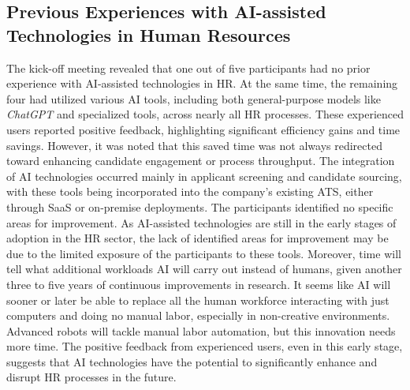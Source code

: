 \documentclass[draft,final]{thesisclass} %
\begin{document}
\subsection{Previous Experiences with \acs{AI}-assisted Technologies in Human Resources}
The kick-off meeting revealed that one out of five participants had no prior experience with \acs{AI}-assisted technologies in \acs{HR}. At the same time, the remaining four had utilized various \acs{AI} tools, including both general-purpose models like \textit{ChatGPT} and specialized tools, across nearly all \acs{HR} processes. These experienced users reported positive feedback, highlighting significant efficiency gains and time savings. However, it was noted that this saved time was not always redirected toward enhancing candidate engagement or process throughput. The integration of \acs{AI} technologies occurred mainly in applicant screening and candidate sourcing, with these tools being incorporated into the company's existing \acs{ATS}, either through \acs{SaaS} or on-premise deployments. The participants identified no specific areas for improvement. As \acs{AI}-assisted technologies are still in the early stages of adoption in the \acs{HR} sector, the lack of identified areas for improvement may be due to the limited exposure of the participants to these tools. 
Moreover, time will tell what additional workloads \acs{AI} will carry out instead of humans, given another three to five years of continuous improvements in research. It seems like \acs{AI} will sooner or later be able to replace all the human workforce interacting with just computers and doing no manual labor, especially in non-creative environments. Advanced robots will tackle manual labor automation, but this innovation needs more time. The positive feedback from experienced users, even in this early stage, suggests that \acs{AI} technologies have the potential to significantly enhance and disrupt \acs{HR} processes in the future.
\end{document}
